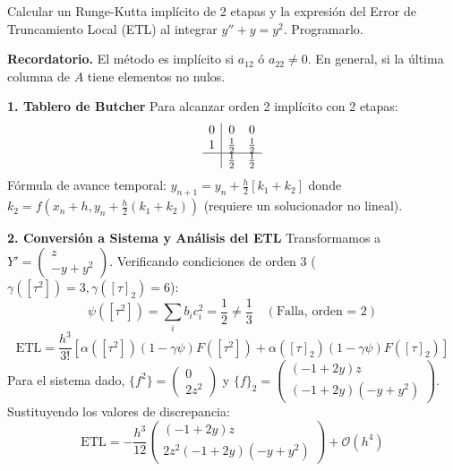 \begin{ejer} 
Calcular un Runge-Kutta implícito de 2 etapas y la expresión del Error de Truncamiento Local (ETL) al integrar $y'' + y = y^2$. Programarlo.
\end{ejer}
\begin{sol} 
\noindent \textbf{Recordatorio.} El m\'etodo es impl\'icito si $a_{12}$ \'o $a_{22} \neq 0$. En general, si la \'ultima columna de $A$ tiene elementos no nulos. 

\textbf{1. Tablero de Butcher}
Para alcanzar orden 2 implícito con 2 etapas:
\[
\begin{array}{c|cc}
0   & 0   & 0   \\
1   & \frac{1}{2} & \frac{1}{2} \\
\hline
    & \frac{1}{2} & \frac{1}{2}
\end{array}
\]
Fórmula de avance temporal: $y_{n+1} = y_n + \frac{h}{2} [k_1 + k_2]$ donde $k_2 = f\left(x_n + h, y_n + \frac{h}{2}(k_1 + k_2)\right)$ (requiere un solucionador no lineal).

\textbf{2. Conversión a Sistema y Análisis del ETL}
Transformamos a $Y' = \begin{pmatrix} z \\ -y + y^2 \end{pmatrix}$.
Verificando condiciones de orden 3 ($\gamma([\tau^2])=3, \gamma([\tau]_2)=6$):
\[
\psi([\tau^2]) = \sum_{i} b_i c_i^2 = \frac{1}{2} \neq \frac{1}{3} \quad (\text{Falla, orden = 2})
\]
\[
\text{ETL} = \frac{h^3}{3!} \left[ \alpha([\tau^2]) (1-\gamma \psi) F([\tau^2]) + \alpha([\tau]_2) (1-\gamma \psi) F([\tau]_2) \right]
\]
Para el sistema dado, $\{f^2\} = \begin{pmatrix} 0 \\ 2z^2 \end{pmatrix}$ y $\{f\}_2 = \begin{pmatrix} (-1+2y)z \\ (-1+2y)(-y+y^2) \end{pmatrix}$.
Sustituyendo los valores de discrepancia:
$$\text{ETL} = -\frac{h^3}{12} \begin{pmatrix} (-1+2y)z \\ 2z^2(-1+2y)(-y+y^2) \end{pmatrix} + \mathcal{O}(h^4)$$
\end{sol}


